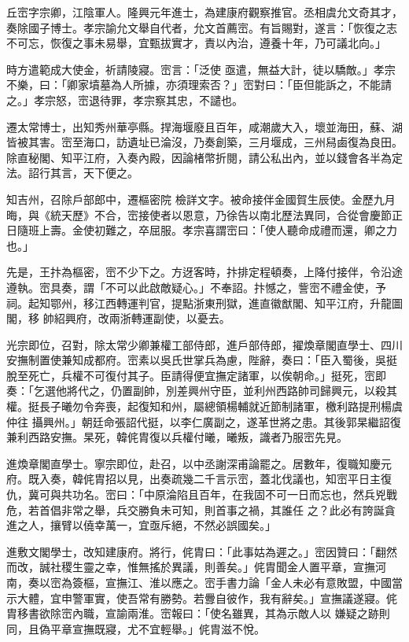 \begin{pinyinscope}
 丘崈字宗卿，江陰軍人。隆興元年進士，為建康府觀察推官。丞相虞允文奇其才，奏除國子博士。孝宗諭允文舉自代者，允文首薦崈。有旨賜對，遂言：「恢復之志不可忘，恢復之事未易舉，宜甄拔實才，責以內治，遵養十年，乃可議北向。」



 時方遣範成大使金，祈請陵寢。崈言：「泛使
 亟遣，無益大計，徒以驕敵。」孝宗不樂，曰：「卿家墳墓為人所據，亦須理索否？」崈對曰：「臣但能訴之，不能請之。」孝宗怒，崈退待罪，孝宗察其忠，不譴也。



 遷太常博士，出知秀州華亭縣。捍海堰廢且百年，咸潮歲大入，壞並海田，蘇、湖皆被其害。崈至海口，訪遺址已淪沒，乃奏創築，三月堰成，三州舄鹵復為良田。除直秘閣、知平江府，入奏內殿，因論楮幣折閱，請公私出內，並以錢會各半為定法。詔行其言，天下便之。



 知吉州，召除戶部郎中，遷樞密院
 檢詳文字。被命接伴金國賀生辰使。金歷九月晦，與《統天歷》不合，崈接使者以恩意，乃徐告以南北歷法異同，合從會慶節正日隨班上壽。金使初難之，卒屈服。孝宗喜謂崈曰：「使人聽命成禮而還，卿之力也。」



 先是，王抃為樞密，崈不少下之。方迓客時，抃排定程頓奏，上降付接伴，令沿途遵執。崈具奏，謂「不可以此啟敵疑心。」不奉詔。抃憾之，訾崈不禮金使，予祠。起知鄂州，移江西轉運判官，提點浙東刑獄，進直徽猷閣、知平江府，升龍圖閣，移
 帥紹興府，改兩浙轉運副使，以憂去。



 光宗即位，召對，除太常少卿兼權工部侍郎，進戶部侍郎，擢煥章閣直學士、四川安撫制置使兼知成都府。崈素以吳氏世掌兵為慮，陛辭，奏曰：「臣入蜀後，吳挺脫至死亡，兵權不可復付其子。臣請得便宜撫定諸軍，以俟朝命。」挺死，崈即奏：「乞選他將代之，仍置副帥，別差興州守臣，並利州西路帥司歸興元，以殺其權。挺長子曦勿令奔喪，起復知和州，屬總領楊輔就近節制諸軍，檄利路提刑楊虞仲往
 攝興州。」朝廷命張詔代挺，以李仁廣副之，遂革世將之患。其後郭杲繼詔復兼利西路安撫。杲死，韓侂胄復以兵權付曦，曦叛，識者乃服崈先見。



 進煥章閣直學士。寧宗即位，赴召，以中丞謝深甫論罷之。居數年，復職知慶元府。既入奏，韓侂胄招以見，出奏疏幾二千言示崈，蓋北伐議也，知崈平日主復仇，冀可與共功名。崈曰：「中原淪陷且百年，在我固不可一日而忘也，然兵兇戰危，若首倡非常之舉，兵交勝負未可知，則首事之禍，其誰任
 之？此必有誇誕貪進之人，攘臂以僥幸萬一，宜亟斥絕，不然必誤國矣。」



 進敷文閣學士，改知建康府。將行，侂胄曰：「此事姑為遲之。」崈因贊曰：「翻然而改，誠社稷生靈之幸，惟無搖於異議，則善矣。」侂胄聞金人置平章，宣撫河南，奏以崈為簽樞，宣撫江、淮以應之。崈手書力論「金人未必有意敗盟，中國當示大體，宜申警軍實，使吾常有勝勢。若釁自彼作，我有辭矣。」宣撫議遂寢。侂胄移書欲除崈內職，宣諭兩淮。崈報曰：「使名雖異，其為示敵人以
 嫌疑之跡則同，且偽平章宣撫既寢，尤不宜輕舉。」侂胄滋不悅。




\end{pinyinscope}
